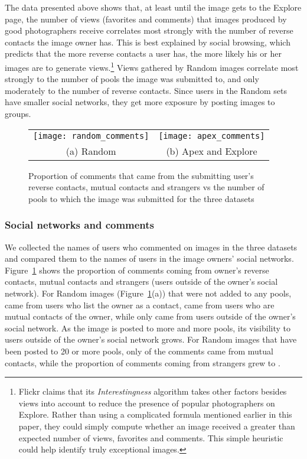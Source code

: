 \documentclass[]{article}
\newcommand{\source}[1]{\textsf{#1}}
\newcommand{\figref}[1]{Figure~\ref{#1}}
\begin{document}
The data presented above shows that, at least until the image gets
to the Explore page, the number of views (favorites and
comments) that images produced by good photographers receive correlates
most strongly with the number of reverse contacts the image owner
has. This is best explained by social browsing, which predicts that
the more reverse contacts a user has, the more likely his or her
images are to generate views.\footnote{Flickr claims that its  \emph{Interestingness} algorithm takes
other factors besides views into account to reduce the presence of
popular photographers on Explore. Rather than using a complicated
formula mentioned earlier in this paper, they could simply compute
whether an image received a greater than expected number of views,
favorites and comments. This simple heuristic could help identify truly
exceptional images.} Views gathered by \source{Random}
images correlate most strongly to the number of pools the image was
submitted to, and only moderately to the number of reverse contacts.
Since users in the \source{Random} sets have smaller social
networks, they get more exposure by posting images to groups.



\begin{figure}[tbh]
 \begin{tabular}{cc}
  \texttt{[image: random\_comments]} &

  \texttt{[image: apex\_comments]} \\
 (a) \source{Random} & (b) \source{Apex} and \source{Explore}
\end{tabular}
  \caption{Proportion of comments
that came from the submitting user's reverse contacts, mutual
contacts and strangers vs the number of pools to which the image was
submitted for the three datasets}
  \label{fig:comments}
\end{figure}


\subsubsection{Social networks and comments}
\label{sec:socnetcomments}
We collected the names of users who commented on images in the
three datasets and compared them to the names of users in the image owners' social
networks. \figref{fig:comments} shows the proportion of comments
coming from owner's reverse contacts, mutual contacts and strangers
(users outside of the owner's social network). For \source{Random} images
(\figref{fig:comments}(a)) that were not
added to any pools,  came from users who list the owner
as a contact,  came from users who are mutual contacts of the
owner, while only  came from users outside of the
owner's social network. As the image is posted to more and
more pools, its visibility to users outside of the owner's
social network grows. For \source{Random} images that have been
posted to 20 or more pools, only  of the comments came from
mutual contacts, while the proportion of comments coming from
strangers grew to .
\end{document}
